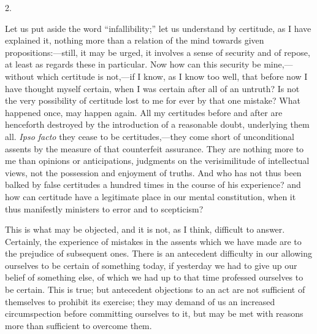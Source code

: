 2.

Let us put aside the word ``infallibility;'' let us
understand by certitude, as I have explained it, nothing more than a
relation of the mind towards given propositions:—still, it may be
urged, it involves a sense of security and of repose, at least as
regards these in particular. Now how can this security be mine,—without
which certitude is not,—if I know, as I know too well, that before
now I have thought myself certain, when I was certain after all of an
untruth? Is not the very possibility of certitude lost to me for ever
by that one mistake? What happened once, may happen again. All my
certitudes before and after are henceforth destroyed by the
introduction of a reasonable doubt, underlying them all. \emph{Ipso facto}
they cease to be certitudes,—they come short of unconditional
assents by the measure of that counterfeit assurance. They are nothing
more to me than opinions or anticipations, judgments on the
verisimilitude of intellectual views, not the possession and enjoyment
of truths. And who has not thus been balked by false certitudes a
hundred times in the course of his experience? and how can certitude
have a legitimate place in our mental constitution, when it thus
manifestly ministers to error and to scepticism?

This is what may be objected, and it is not, as I think, difficult
to answer. Certainly, the experience of mistakes in the assents which
we have made are to the prejudice of subsequent ones. There is an
antecedent difficulty in our allowing ourselves to be certain of
something today, if yesterday we had to give up our belief of
something else, of which we had up to that time professed ourselves to
be certain. This is true; but antecedent objections to an act are not
sufficient of themselves to prohibit its exercise; they may demand of
us an increased circumspection before committing ourselves to it, but
may be met with reasons more than sufficient to overcome them.

